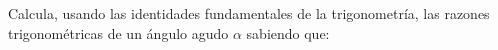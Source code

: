 \documentclass[addpoints,spanish, 12pt,a4paper]{exam}
\begin{document}
\begin{questions}






\question Calcula, usando las identidades fundamentales de la trigonometría, las razones trigonométricas de un ángulo agudo $\alpha$ sabiendo que: 


\end{questions}
\end{document}
